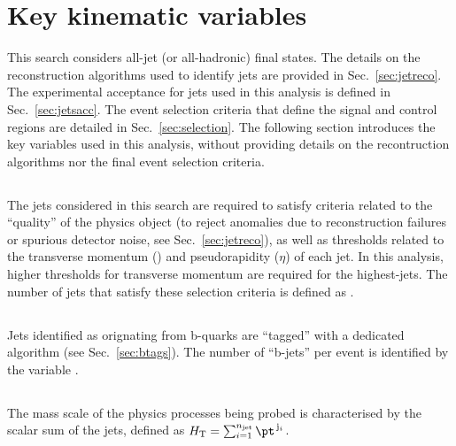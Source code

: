 \section{Key kinematic variables}
\label{sec:kine}

This search considers all-jet (or all-hadronic) final states. The
details on the reconstruction algorithms used to identify jets are
provided in Sec.~\ref{sec:jetreco}. The experimental acceptance for
jets used in this analysis is defined in Sec.~\ref{sec:jetsacc}. The
event selection criteria that define the signal and control regions
are detailed in Sec.~\ref{sec:selection}. The following section
introduces the key variables used in this analysis, without providing
details on the recontruction algorithms nor the final event selection
criteria.

\subsection{\texorpdfstring{\njet}{Njet}}

The jets considered in this search are required to satisfy criteria
related to the ``quality'' of the physics object (to reject anomalies
due to \eg reconstruction failures or spurious detector noise, see
Sec.~\ref{sec:jetreco}), as well as thresholds related to the
transverse momentum (\Pt) and pseudorapidity ($\eta$) of each jet. In
this analysis, higher thresholds for transverse momentum are required
for the highest-\Pt jets. The number of jets that satisfy these
selection criteria is defined as \njet.

\subsection{\texorpdfstring{\nb}{Nb}}

Jets identified as orignating from b-quarks are ``tagged'' with a
dedicated algorithm (see Sec.~\ref{sec:btags}). The number of
``b-jets'' per event is identified by the variable \nb.

\subsection{\texorpdfstring{\scalht}{HT}}

The mass scale of the physics processes being probed is characterised
by the scalar \pt sum of the jets, defined as $\scalht =
\sum_{i=1}^{\njet} \pt^{\,\mathrm{j}_i}$.

